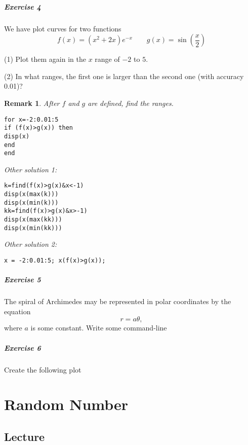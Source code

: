 \documentclass[a4paper]{book}
\newtheorem*{remark}{Remark}
\begin{document}


\paragraph{Exercise 4}
We have plot curves for two functions
\[
f(x)=(x^2+2x)e^{-x} \qquad g(x)=\sin{\left(\frac{x}{2}\right)}
\]

(1) Plot them again in the $x$ range of $-2$ to $5$.

(2) In what ranges, the first one is larger than the second one
(with accuracy 0.01)?

\begin{remark}
After $f$ and $g$ are defined, find the ranges.
\begin{lstlisting}
for x=-2:0.01:5
if (f(x)>g(x)) then
disp(x)
end
end
\end{lstlisting}
Other solution 1:
\begin{lstlisting}
k=find(f(x)>g(x)&x<-1)
disp(x(max(k)))
disp(x(min(k)))
kk=find(f(x)>g(x)&x>-1)
disp(x(max(kk)))
disp(x(min(kk)))
\end{lstlisting}
Other solution 2:
\begin{lstlisting}
x = -2:0.01:5; x(f(x)>g(x));
\end{lstlisting}
\end{remark}

\paragraph{Exercise 5}
The spiral of Archimedes  may be represented in polar coordinates
by the equation
\[
r = a \theta,
\]
where $a$ is some constant. Write some command-line 


\paragraph{Exercise 6}
Create the following plot




\chapter{Random Number}
\section{Lecture}

\end{document}
